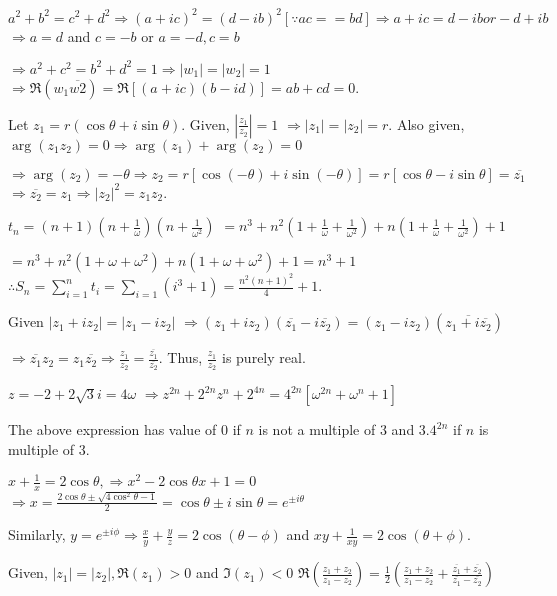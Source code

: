   $a^2 + b^2 = c^2 + d^2 \Rightarrow (a + ic)^2 = (d - ib)^2[\because ac = =bd] \Rightarrow a + ic = d - ib
  or -d + ib$ $\Rightarrow a = d$ and $c = -b$ or $a = -d, c = b$

  $\Rightarrow a^2 + c^2 = b^2 + d^2 = 1 \Rightarrow |w_1| = |w_2| = 1$
  $\Rightarrow \Re(w_1\overline{w2}) = \Re[(a + ic)(b - id)] = ab + cd = 0$.
\item Let $z_1 = r(\cos\theta + i\sin\theta)$. Given, $\left|\frac{z_1}{z_2}\right| = 1$
  $\Rightarrow |z_1| = |z_2| = r$. Also given, $\arg(z_1z_2) = 0 \Rightarrow \arg(z_1) + \arg(z_2) = 0$

  $\Rightarrow \arg(z_2) = -\theta \Rightarrow z_2 = r[\cos(-\theta) + i\sin(-\theta)] = r[\cos\theta -
  i\sin\theta] = \overline{z_1}$
  $\Rightarrow \overline{z_2} = z_1 \Rightarrow |z_2|^2 = z_1z_2$.
\item $t_n = (n + 1)\left(n + \frac{1}{\omega}\right)\left(n + \frac{1}{\omega^2}\right)$
  $= n^3 + n^2\left(1 + \frac{1}{\omega} + \frac{1}{\omega^2}\right) + n\left(1 + \frac{1}{\omega} +
  \frac{1}{\omega^2}\right) + 1$

  $= n^3 + n^2(1 + \omega + \omega^2) + n(1 + \omega + \omega^2) + 1 = n^3 + 1$
  $\displaystyle\therefore S_n = \sum_{i = 1}^nt_i = \sum_{i = 1}(i^3 + 1) = \frac{n^2(n + 1)^2}{4} + 1$.
\item Given $|z_1 + iz_2| = |z_1 - iz_2|$
  $\Rightarrow (z_1 + iz_2)(\overline{z_1} - i\overline{z_2}) = (z_1 - iz_2)(\overline{z_1 +
  i\overline{z_2}})$

  $\Rightarrow \overline{z_1}z_2 = z_1\overline{z_2} \Rightarrow \frac{z_1}{z_2} =
  \frac{\overline{z_1}}{\overline{z_2}}$.
  Thus, $\frac{z_1}{z_2}$ is purely real.
\item $z = -2 + 2\sqrt{3}i = 4\omega$
  $\Rightarrow z^{2n} + 2^{2n}z^n + 2^{4n} = 4^{2n}[\omega^{2n} + \omega^n + 1]$

  The above expression has value of $0$ if $n$ is not a multiple of $3$ and $3.4^{2n}$ if $n$ is multiple of
  $3$.
\item $x + \frac{1}{x} = 2\cos\theta, \Rightarrow x^2 - 2\cos\theta x + 1 = 0$
  $\Rightarrow x = \frac{2\cos\theta \pm \sqrt{4\cos^2\theta - 1}}{2} = \cos\theta \pm i\sin\theta = e^{\pm
  i\theta}$

  Similarly, $y = e^{\pm i\phi}\Rightarrow \frac{x}{y} + \frac{y}{z} = 2\cos(\theta - \phi)$
  and $xy + \frac{1}{xy} = 2\cos(\theta + \phi)$.
\item Given, $|z_1| = |z_2|, \Re(z_1) > 0$ and $\Im(z_1) < 0$
  $\Re\left(\frac{z_1 + z_2}{z_1 - z_2}\right) = \frac{1}{2}\left(\frac{z_1 + z_2}{z_1 - z_2} +
  \frac{\overline{z_1} + \overline{z_2}}{\overline{z_1} - \overline{z_2}}\right)$

